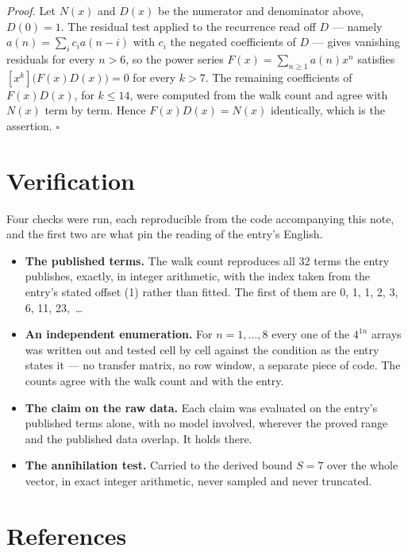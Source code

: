 \documentclass[11pt]{article}
\theoremstyle{definition}
\begin{document}
{\itshape Proof.} Let $N(x)$ and $D(x)$ be the numerator and denominator above, $D(0)=1$. The residual test applied to the recurrence read off $D$ --- namely $a(n) = \sum_i c_i a(n-i)$ with $c_i$ the negated coefficients of $D$ --- gives vanishing residuals for every $n > 6$, so the power series $F(x)=\sum_{n\ge 1}a(n)x^n$ satisfies $[x^k]\bigl(F(x)D(x)\bigr) = 0$ for every $k > 7$. The remaining coefficients of $F(x)D(x)$, for $k \le 14$, were computed from the walk count and agree with $N(x)$ term by term. Hence $F(x)D(x) = N(x)$ identically, which is the assertion. $\square$

\section{Verification}

Four checks were run, each reproducible from the code accompanying this note, and the first two are what pin the reading of the entry's English.

\begin{itemize}

\item {\bfseries The published terms.} The walk count reproduces all 32 terms the entry publishes, exactly, in integer arithmetic, with the index taken from the entry's stated offset (1) rather than fitted. The first of them are 0, 1, 1, 2, 3, 6, 11, 23,~\dots

\item {\bfseries An independent enumeration.} For $n = 1,\dots,8$ every one of the $4^{1n}$ arrays was written out and tested cell by cell against the condition as the entry states it --- no transfer matrix, no row window, a separate piece of code. The counts agree with the walk count and with the entry.

\item {\bfseries The claim on the raw data.} Each claim was evaluated on the entry's published terms alone, with no model involved, wherever the proved range and the published data overlap. It holds there.

\item {\bfseries The annihilation test.} Carried to the derived bound $S = 7$ over the whole vector, in exact integer arithmetic, never sampled and never truncated.

\end{itemize}

\section{References}
\end{document}
